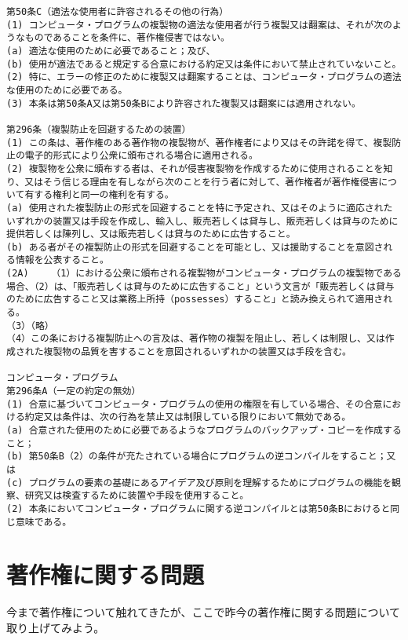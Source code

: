 \documentclass[a4j]{jsarticle}
\begin{document}
\begin{verbatim}
第50条C（適法な使用者に許容されるその他の行為）
(1)	コンピュータ・プログラムの複製物の適法な使用者が行う複製又は翻案は、それが次のようなものであることを条件に、著作権侵害ではない。
(a)	適法な使用のために必要であること；及び、
(b)	使用が適法であると規定する合意における約定又は条件において禁止されていないこと。
(2)	特に、エラーの修正のために複製又は翻案することは、コンピュータ・プログラムの適法な使用のために必要である。
(3)	本条は第50条A又は第50条Bにより許容された複製又は翻案には適用されない。

第296条（複製防止を回避するための装置）
(1)	この条は、著作権のある著作物の複製物が、著作権者により又はその許諾を得て、複製防止の電子的形式により公衆に頒布される場合に適用される。
(2)	複製物を公衆に頒布する者は、それが侵害複製物を作成するために使用されることを知り、又はそう信じる理由を有しながら次のことを行う者に対して、著作権者が著作権侵害について有する権利と同一の権利を有する。
(a)	使用された複製防止の形式を回避することを特に予定され、又はそのように適応されたいずれかの装置又は手段を作成し、輸入し、販売若しくは貸与し、販売若しくは貸与のために提供若しくは陳列し、又は販売若しくは貸与のために広告すること。
(b)	ある者がその複製防止の形式を回避することを可能とし、又は援助することを意図される情報を公表すること。
(2A)	（1）における公衆に頒布される複製物がコンピュータ・プログラムの複製物である場合、（2）は、「販売若しくは貸与のために広告すること」という文言が「販売若しくは貸与のために広告すること又は業務上所持（possesses）すること」と読み換えられて適用される。
（3）（略）
（4）この条における複製防止への言及は、著作物の複製を阻止し、若しくは制限し、又は作成された複製物の品質を害することを意図されるいずれかの装置又は手段を含む。

コンピュータ・プログラム
第296条A（一定の約定の無効）
(1)	合意に基づいてコンピュータ・プログラムの使用の権限を有している場合、その合意における約定又は条件は、次の行為を禁止又は制限している限りにおいて無効である。
(a)	合意された使用のために必要であるようなプログラムのバックアップ・コピーを作成すること；
(b)	第50条B（2）の条件が充たされている場合にプログラムの逆コンパイルをすること；又は
(c)	プログラムの要素の基礎にあるアイデア及び原則を理解するためにプログラムの機能を観察、研究又は検査するために装置や手段を使用すること。
(2)	本条においてコンピュータ・プログラムに関する逆コンパイルとは第50条Bにおけると同じ意味である。

\end{verbatim} 
\cite{def_eng}
\part{著作権に関する問題}
今まで著作権について触れてきたが、ここで昨今の著作権に関する問題について取り上げてみよう。
\end{document}
